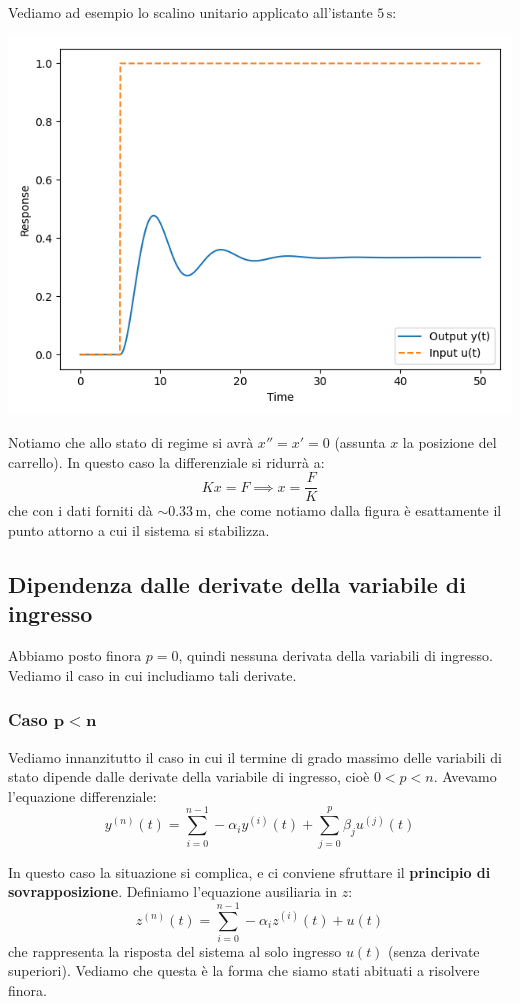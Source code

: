 \documentclass[a4paper,11pt]{article}
\begin{document}
Vediamo ad esempio lo scalino unitario applicato all'istante $5 \, \mathrm{s}$:
\begin{center}
\includegraphics[scale=0.65]{../figures/mass-spring-damper-response.png}
\end{center}

Notiamo che allo stato di regime si avrà $x'' = x' = 0$ (assunta $x$ la posizione del carrello).
In questo caso la differenziale si ridurrà a:
$$
Kx = F \implies x = \frac{F}{K}
$$
che con i dati forniti dà $\sim 0.33 \, \mathrm{m}$, che come notiamo dalla figura è esattamente il punto attorno a cui il sistema si stabilizza.

\subsection{Dipendenza dalle derivate della variabile di ingresso}
Abbiamo posto finora $p = 0$, quindi nessuna derivata della variabili di ingresso.
Vediamo il caso in cui includiamo tali derivate.

\subsubsection{Caso $\mathbf{p < n}$}
Vediamo innanzitutto il caso in cui il termine di grado massimo delle variabili di stato dipende dalle derivate della variabile di ingresso, cioè $0 < p < n$.
Avevamo l'equazione differenziale:
$$
y^{(n)} (t) = \sum_{i=0}^{n-1} - \alpha_i y^{(i)}(t) + \sum_{j=0}^p \beta_j u^{(j)}(t)
$$

In questo caso la situazione si complica, e ci conviene sfruttare il \textbf{principio di sovrapposizione}.
Definiamo l'equazione ausiliaria in $z$:
$$
z^{(n)}(t) = \sum_{i = 0}^{n - 1} -\alpha_i z^{(i)}(t) + u(t)
$$
che rappresenta la risposta del sistema al solo ingresso $u(t)$ (senza derivate superiori).
Vediamo che questa è la forma che siamo stati abituati a risolvere finora.
\end{document}
